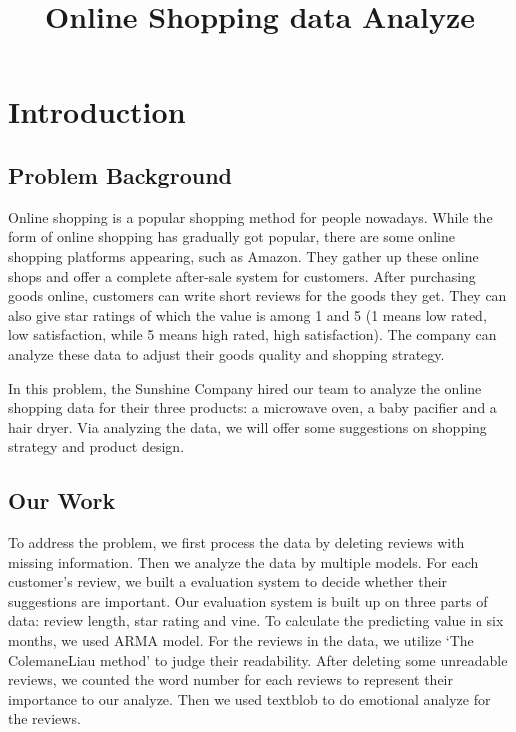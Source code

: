 \documentclass[12pt]{mcmthesis}
\begin{document}
\linespread{0.6}
\setlength{\parskip}{0.5\baselineskip}
\title{Online Shopping data Analyze}

\date{}
\begin{abstract}
    \begin{keywords}
    
    
    \end{keywords}
\end{abstract}


\maketitle

\tableofcontents

\newpage


\section{Introduction}

\subsection{Problem Background}
Online shopping is a popular shopping method for people nowadays. While the form of online shopping has gradually got popular, there are some online shopping platforms appearing, such as Amazon. They gather up these online shops and offer a complete after-sale system for customers. After purchasing goods online, customers can write short reviews for the goods they get. They can also give star ratings of which the value is among 1 and 5 (1 means low rated, low satisfaction, while 5 means high rated, high satisfaction). The company can analyze these data to adjust their goods quality and shopping strategy.


In this problem, the Sunshine Company hired our team to analyze the online shopping data for their three products: a microwave oven, a baby pacifier and a hair dryer. Via analyzing the data, we will offer some suggestions on shopping strategy and product design.

\subsection{Our Work}
To address the problem, we first process the data by deleting reviews with missing information. Then we analyze the data by multiple models. For each customer's review, we built a evaluation system to decide whether their suggestions are important. Our evaluation system is built up on three parts of data: review length, star rating and vine. To calculate the predicting value in six months, we used ARMA model. For the reviews in the data, we utilize `The ColemaneLiau method' to judge their readability. After deleting some unreadable reviews, we counted the word number for each reviews to represent their importance to our analyze. Then we used textblob to do emotional analyze for the reviews.
\end{document}
